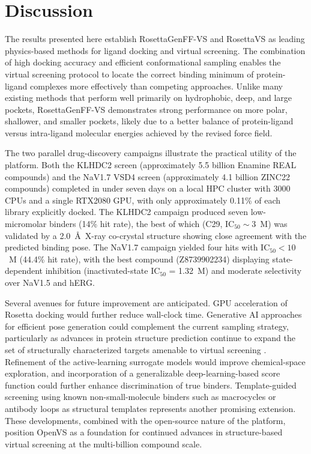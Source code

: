 \documentclass[10pt]{article}
\begin{document}
\section{Discussion}

The results presented here establish RosettaGenFF-VS and RosettaVS as leading
physics-based methods for ligand docking and virtual screening. The combination
of high docking accuracy and efficient conformational sampling enables the
virtual screening protocol to locate the correct binding minimum of
protein-ligand complexes more effectively than competing approaches. Unlike
many existing methods that perform well primarily on hydrophobic, deep, and
large pockets, RosettaGenFF-VS demonstrates strong performance on more polar,
shallower, and smaller pockets, likely due to a better balance of
protein-ligand versus intra-ligand molecular energies achieved by the revised
force field.

The two parallel drug-discovery campaigns illustrate the practical utility of
the platform. Both the KLHDC2 screen (approximately 5.5 billion Enamine REAL
compounds) and the NaV1.7 VSD4 screen (approximately 4.1 billion ZINC22
compounds) completed in under seven days on a local HPC cluster with 3000 CPUs
and a single RTX2080 GPU, with only approximately 0.11\% of each library
explicitly docked. The KLHDC2 campaign produced seven low-micromolar binders
(14\% hit rate), the best of which (C29, IC$_{50} \sim 3$~\textmu M) was
validated by a 2.0~\AA\ X-ray co-crystal structure showing close agreement
with the predicted binding pose. The NaV1.7 campaign yielded four hits with
IC$_{50} < 10$~\textmu M (44.4\% hit rate), with the best compound
(Z8739902234) displaying state-dependent inhibition (inactivated-state
IC$_{50}$ = 1.32~\textmu M) and moderate selectivity over NaV1.5 and hERG.

Several avenues for future improvement are anticipated. GPU acceleration of
Rosetta docking would further reduce wall-clock time. Generative AI approaches
for efficient pose generation could complement the current sampling strategy,
particularly as advances in protein structure prediction
\citep{tunyasuvunakool2021alphafold} continue to expand the set of
structurally characterized targets amenable to virtual screening
\citep{irwin2005metalloenzyme}. Refinement of the active-learning surrogate
models would improve chemical-space exploration, and incorporation of a
generalizable deep-learning-based score function could further enhance
discrimination of true binders. Template-guided
screening using known non-small-molecule binders such as macrocycles or antibody
loops as structural templates represents another promising extension. These
developments, combined with the open-source nature of the platform, position
OpenVS as a foundation for continued advances in structure-based virtual
screening at the multi-billion compound scale.




\end{document}
